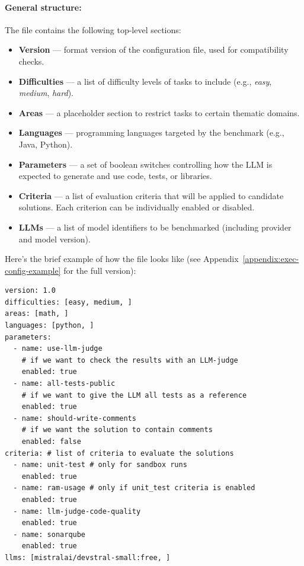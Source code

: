 \paragraph{General structure:}
The file contains the following top-level sections:

\begin{itemize}
    \item \textbf{Version} --- format version of the configuration file, used for compatibility checks.
    \item \textbf{Difficulties} --- a list of difficulty levels of tasks to include (e.g., \emph{easy}, \emph{medium}, \emph{hard}).
    \item \textbf{Areas} --- a placeholder section to restrict tasks to certain thematic domains.
    \item \textbf{Languages} --- programming languages targeted by the benchmark (e.g., Java, Python).
    \item \textbf{Parameters} --- a set of boolean switches controlling how the LLM is expected to generate and use code, tests, or libraries.
    \item \textbf{Criteria} --- a list of evaluation criteria that will be applied to candidate solutions. Each criterion can be individually enabled or disabled.
    \item \textbf{LLMs} --- a list of model identifiers to be benchmarked (including provider and model version).
\end{itemize}

Here's the brief example of how the file looks like (see Appendix~\ref{appendix:exec-config-example} for the full version):

\begin{verbatim}
version: 1.0
difficulties: [easy, medium, ]
areas: [math, ]
languages: [python, ]
parameters:
  - name: use-llm-judge
    # if we want to check the results with an LLM-judge
    enabled: true
  - name: all-tests-public
    # if we want to give the LLM all tests as a reference
    enabled: true
  - name: should-write-comments
    # if we want the solution to contain comments
    enabled: false
criteria: # list of criteria to evaluate the solutions
  - name: unit-test # only for sandbox runs
    enabled: true
  - name: ram-usage # only if unit_test criteria is enabled
    enabled: true
  - name: llm-judge-code-quality
    enabled: true
  - name: sonarqube
    enabled: true
llms: [mistralai/devstral-small:free, ]
\end{verbatim}

